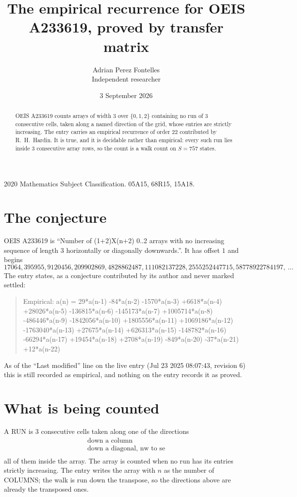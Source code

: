 \documentclass[11pt,a4paper]{article}
\title{The empirical recurrence for OEIS A233619, proved by transfer matrix}
\author{Adrian Perez Fontelles\\ \small Independent researcher}
\date{3 September 2026}
\theoremstyle{plain}
\theoremstyle{definition}
\begin{document}
\maketitle

\begin{abstract}
OEIS A233619 counts arrays of width $3$ over $\{0,1,2\}$ containing no run of $3$ consecutive
cells, taken along a named direction of the grid, whose entries are strictly increasing. The entry carries
an empirical recurrence of order $22$ contributed by R.~H.~Hardin. It is true, and it is
decidable rather than empirical: every such run lies inside $3$ consecutive array rows, so
the count is a walk count on $S=757$ states.
\end{abstract}

\noindent\small 2020 Mathematics Subject Classification. 05A15, 68R15, 15A18.\normalsize

\section{The conjecture}

OEIS A233619 is ``Number of (1+2)X(n+2) 0..2 arrays with no increasing sequence of length 3 horizontally or diagonally downwards.''. It has offset $1$ and begins
\[
17064, 395955, 9120456, 209902869, 4828862487, 111082137228, 2555252447715, 58778922784197,\ \dots
\]
The entry states, as a conjecture contributed by its author and never marked settled:
\begin{quote}
Empirical: a(n) = 29*a(n-1) -84*a(n-2) -1570*a(n-3) +6618*a(n-4) +28026*a(n-5) -136815*a(n-6) -145173*a(n-7) +1005714*a(n-8) -486446*a(n-9) -1842056*a(n-10) +1805556*a(n-11) +1069186*a(n-12) -1763040*a(n-13) +27675*a(n-14) +626313*a(n-15) -148782*a(n-16) -66294*a(n-17) +19454*a(n-18) +2708*a(n-19) -849*a(n-20) -37*a(n-21) +12*a(n-22)
\end{quote}
As of the ``Last modified'' line on the live entry (Jul 23 2025 08:07:43, revision 6) this is still
recorded as empirical, and nothing on the entry records it as proved.

\section{What is being counted}

A RUN is $3$ consecutive cells taken along one of the directions
\[
\begin{array}{l}
\text{down a column} \\
\text{down a diagonal, nw to se} \\
\end{array}
\]
all of them inside the array. The array is counted when no run has its entries strictly increasing. The entry writes the array with $n$ as the number of COLUMNS; the walk is run down the transpose, so the directions above are already the transposed ones.
\end{document}
